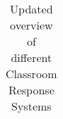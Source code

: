 \begin{landscape}
\begin{center}
\begin{table}[H]
\begin{tabularx}{\paperwidth}{ |X|X|X|X|X|X|X|X|X| }
            \end{tabularx}
            \caption{Updated overview of different Classroom Response Systems}\label{tab:overview-2}
        \end{table}
    \end{center}
\end{landscape}